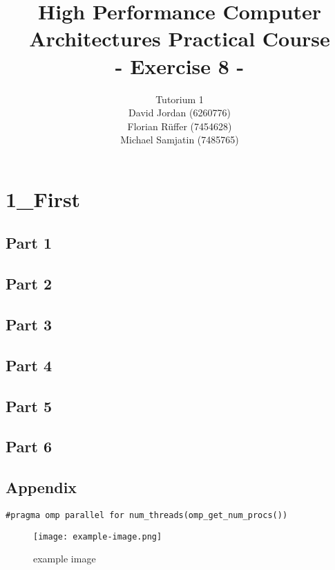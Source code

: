 \documentclass{article}
\title{\textbf{High Performance Computer Architectures Practical Course \\ - Exercise 8 -} \\[10mm]}
\author{Tutorium 1 \\[10mm] David Jordan (6260776) \\[1mm] Florian Rüffer (7454628) \\[1mm] Michael Samjatin (7485765) \\[10mm]}
\begin{document}
\maketitle
\newpage
\section*{1\_First}
\subsection*{Part 1}
\subsection*{Part 2}
\subsection*{Part 3}
\subsection*{Part 4}
\subsection*{Part 5}
\subsection*{Part 6}
\subsection*{Appendix}

\begin{lstlisting}[caption=example code]
    #pragma omp parallel for num_threads(omp_get_num_procs())
\end{lstlisting}

\begin{figure}[H]
    \centering
    \texttt{[image: example-image.png]} 
    \caption{example image}
    \label{fig:graph}
\end{figure}
\end{document}
